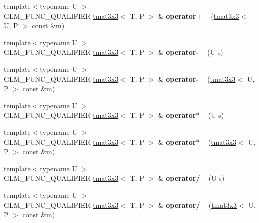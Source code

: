 \begin{DoxyCompactItemize}
\item 
\mbox{\label{structglm_1_1tmat3x3_a767f25ce5e8dfe01f93427ab11f66b68}} 
{\footnotesize template$<$typename U $>$ }\\G\+L\+M\+\_\+\+F\+U\+N\+C\+\_\+\+Q\+U\+A\+L\+I\+F\+I\+ER \hyperlink{structglm_1_1tmat3x3}{tmat3x3}$<$ T, P $>$ \& {\bfseries operator+=} (\hyperlink{structglm_1_1tmat3x3}{tmat3x3}$<$ U, P $>$ const \&m)
\item 
\mbox{\label{structglm_1_1tmat3x3_a166d5db3f6cf38eacecbe33437776c7a}} 
{\footnotesize template$<$typename U $>$ }\\G\+L\+M\+\_\+\+F\+U\+N\+C\+\_\+\+Q\+U\+A\+L\+I\+F\+I\+ER \hyperlink{structglm_1_1tmat3x3}{tmat3x3}$<$ T, P $>$ \& {\bfseries operator-\/=} (U s)
\item 
\mbox{\label{structglm_1_1tmat3x3_ad9a2afce6d4b6fe5945d6b76e4f41163}} 
{\footnotesize template$<$typename U $>$ }\\G\+L\+M\+\_\+\+F\+U\+N\+C\+\_\+\+Q\+U\+A\+L\+I\+F\+I\+ER \hyperlink{structglm_1_1tmat3x3}{tmat3x3}$<$ T, P $>$ \& {\bfseries operator-\/=} (\hyperlink{structglm_1_1tmat3x3}{tmat3x3}$<$ U, P $>$ const \&m)
\item 
\mbox{\label{structglm_1_1tmat3x3_ae74a84be216d7521d27a54d582a161c6}} 
{\footnotesize template$<$typename U $>$ }\\G\+L\+M\+\_\+\+F\+U\+N\+C\+\_\+\+Q\+U\+A\+L\+I\+F\+I\+ER \hyperlink{structglm_1_1tmat3x3}{tmat3x3}$<$ T, P $>$ \& {\bfseries operator$\ast$=} (U s)
\item 
\mbox{\label{structglm_1_1tmat3x3_a569e06a5f10051a2022d0be0af4c5e7b}} 
{\footnotesize template$<$typename U $>$ }\\G\+L\+M\+\_\+\+F\+U\+N\+C\+\_\+\+Q\+U\+A\+L\+I\+F\+I\+ER \hyperlink{structglm_1_1tmat3x3}{tmat3x3}$<$ T, P $>$ \& {\bfseries operator$\ast$=} (\hyperlink{structglm_1_1tmat3x3}{tmat3x3}$<$ U, P $>$ const \&m)
\item 
\mbox{\label{structglm_1_1tmat3x3_af0edea7ecc6cfc8344c91f9aeb0dcef4}} 
{\footnotesize template$<$typename U $>$ }\\G\+L\+M\+\_\+\+F\+U\+N\+C\+\_\+\+Q\+U\+A\+L\+I\+F\+I\+ER \hyperlink{structglm_1_1tmat3x3}{tmat3x3}$<$ T, P $>$ \& {\bfseries operator/=} (U s)
\item 
\mbox{\label{structglm_1_1tmat3x3_a0adc3f9a1be28dd0e4ea34c816b364fc}} 
{\footnotesize template$<$typename U $>$ }\\G\+L\+M\+\_\+\+F\+U\+N\+C\+\_\+\+Q\+U\+A\+L\+I\+F\+I\+ER \hyperlink{structglm_1_1tmat3x3}{tmat3x3}$<$ T, P $>$ \& {\bfseries operator/=} (\hyperlink{structglm_1_1tmat3x3}{tmat3x3}$<$ U, P $>$ const \&m)
\end{DoxyCompactItemize}
